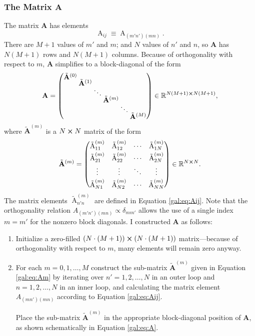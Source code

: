 \documentclass[11pt, a4paper]{article}
\newcommand{\mat}[1]{\mathbf{#1}}
\newcommand{\tmat}[1]{\tilde{\mathbf{#1}}}
\newcommand{\A}{\operatorname{A}}  %
\newcommand{\tA}{\tilde{\operatorname{A}}} %
\begin{document}
\subsubsection{The Matrix A}
The matrix $ \mat{A} $ has elements
\begin{equation*}
	\A_{ij} \equiv \A_{(m'n')(mn)}.
\end{equation*}
There are $ M+1 $ values of $ m' $ and $ m $; and $ N $ values of $ n' $ and $ n $, so $ \mat{A} $ has $ N(M+1) $ rows and $ N(M+1) $ columns. Because of orthogonality with respect to $ m $, $ \mat{A} $ simplifies to a block-diagonal of the form
\begin{equation}
\begingroup
\setlength\arraycolsep{1.0pt}
\renewcommand*{\arraystretch}{0.0}
	\mat{A} = 
	\begin{pmatrix}
	 \tmat{A}^{(0)} & & & & & \\
	 & \tmat{A}^{(1)}  & & & & \\
	 & & \ddots         & & & \\
	 & & & \tmat{A}^{(m)} & & \\
	 & & & & \ddots         & \\
	 & & & & & \tmat{A}^{(M)} 
	\end{pmatrix}
	\in \mathbb{R}^{N(M+1) \cross N(M+1)} \label{gal:eq:A},
\endgroup
\end{equation}
where $ \tmat{A}^{(m)} $ is a $ N \cross N $ matrix of the form
\begin{equation}
	\tmat{A}^{(m)} = 
	\begin{pmatrix}
	 \tA^{(m)}_{11}  & \tA^{(m)}_{12} & \cdots & \tA^{(m)}_{1N} \\[2mm]
	 \tA^{(m)}_{21}  & \tA^{(m)}_{22} & \cdots &  \tA^{(m)}_{2N} \\[2mm]
  \vdots  & \vdots & \ddots & \vdots \\[2mm]
		 \tA^{(m)}_{N1}  & \tA^{(m)}_{N2} & \cdots & \tA^{(m)}_{NN}
	\end{pmatrix}
	\in \mathbb{R}^{N \cross N} \label{gal:eq:Am}.
\end{equation}
The matrix elements $ \tA^{(m)}_{n'n} $ are defined in Equation \ref{gal:eq:Aij}. Note that the orthogonality relation $ A_{(m'n')(mn)} \propto \delta_{mm'} $ allows the use of a single index $ m = m' $ for the nonzero block diagonals. I constructed $ \mat{A} $ as follows:
\begin{enumerate}
	\item Initialize a zero-filled $ (N\cdot(M+1))\cross(N\cdot(M+1))$ matrix---because of orthogonality with respect to $ m $, many elements will remain zero anyway. 
	
	\item For each $ m = 0, 1, \ldots, M $ construct the sub-matrix $ \tmat{A}^{(m)} $ given in Equation \ref{gal:eq:Am} by iterating over $ n' = 1, 2, \ldots, N $ in an outer loop and $ n = 1, 2, \ldots, N $ in an inner loop, and calculating the matrix element $ A_{(mn')(mn)} $ according to Equation \ref{gal:eq:Aij}. 
	
	Place the sub-matrix $ \tmat{A}^{(m)} $ in the appropriate block-diagonal position of $ \mat{A} $, as shown schematically in Equation \ref{gal:eq:A}.
\end{enumerate}
\end{document}

